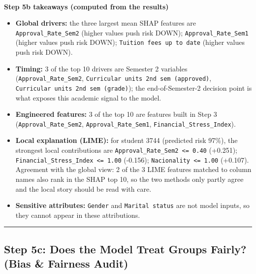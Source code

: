 \documentclass[11pt]{article}
\providecommand{\tightlist}{%
      \setlength{\itemsep}{0pt}\setlength{\parskip}{0pt}}
\begin{document}
    \begin{center}
    \end{center}
    { \hspace*{\fill} \\}
    
    \textbf{Step 5b takeaways (computed from the results)}

\begin{itemize}
\tightlist
\item
  \textbf{Global drivers:} the three largest mean
  \textbar SHAP\textbar{} features are \texttt{Approval\_Rate\_Sem2}
  (higher values push risk DOWN); \texttt{Approval\_Rate\_Sem1} (higher
  values push risk DOWN); \texttt{Tuition\ fees\ up\ to\ date} (higher
  values push risk DOWN).
\item
  \textbf{Timing:} 3 of the top 10 drivers are Semester 2 variables
  (\texttt{Approval\_Rate\_Sem2},
  \texttt{Curricular\ units\ 2nd\ sem\ (approved)},
  \texttt{Curricular\ units\ 2nd\ sem\ (grade)}); the end-of-Semester-2
  decision point is what exposes this academic signal to the model.
\item
  \textbf{Engineered features:} 3 of the top 10 are features built in
  Step 3 (\texttt{Approval\_Rate\_Sem2}, \texttt{Approval\_Rate\_Sem1},
  \texttt{Financial\_Stress\_Index}).
\item
  \textbf{Local explanation (LIME):} for student 3744 (predicted risk
  97\%), the strongest local contributions are
  \texttt{Approval\_Rate\_Sem2\ \textless{}=\ 0.40} (+0.251);
  \texttt{Financial\_Stress\_Index\ \textless{}=\ 1.00} (-0.156);
  \texttt{Nacionality\ \textless{}=\ 1.00} (+0.107). Agreement with the
  global view: 2 of the 3 LIME features matched to column names also
  rank in the SHAP top 10, so the two methods only partly agree and the
  local story should be read with care.
\item
  \textbf{Sensitive attributes:} \texttt{Gender} and
  \texttt{Marital\ status} are not model inputs, so they cannot appear
  in these attributions.
\end{itemize}

    
    \begin{center}\rule{0.5\linewidth}{0.5pt}\end{center}

\hypertarget{step-5c-does-the-model-treat-groups-fairly-bias-fairness-audit}{%
\subsection{Step 5c: Does the Model Treat Groups Fairly? (Bias \&
Fairness
Audit)}\label{step-5c-does-the-model-treat-groups-fairly-bias-fairness-audit}}
\end{document}
